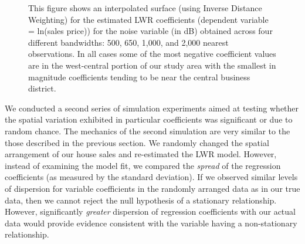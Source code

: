 \documentclass[leqno]{article}\usepackage[]{graphicx}\usepackage[]{color}
\begin{document}
\begin{figure}
 \caption{This figure shows an interpolated surface (using Inverse Distance Weighting) for the estimated LWR coefficients (dependent variable = ln(sales price)) for the noise variable (in dB) obtained across four different bandwidths: 500, 650, 1,000, and 2,000 nearest observations. In all cases some of the most negative coefficient values are in the west-central portion of our study area with the smallest in magnitude coefficients tending to be near the central business district.}
 \label{fig:NoiseBetas}
\end{figure}

We conducted a second series of simulation experiments aimed at testing whether the spatial variation exhibited in particular coefficients was significant or due to random chance. The mechanics of the second simulation are very similar to the those described in the previous section. We randomly changed the spatial arrangement of our house sales and re-estimated the LWR model. However, instead of examining the model fit, we compared the \emph{spread} of the regression coefficients (as measured by the standard deviation). If we observed similar levels of dispersion for variable coefficients in the randomly arranged data as in our true data, then we cannot reject the null hypothesis of a stationary relationship. However, significantly \emph{greater} dispersion of regression coefficients with our actual data would provide evidence consistent with the variable having a non-stationary relationship. 
\end{document}
